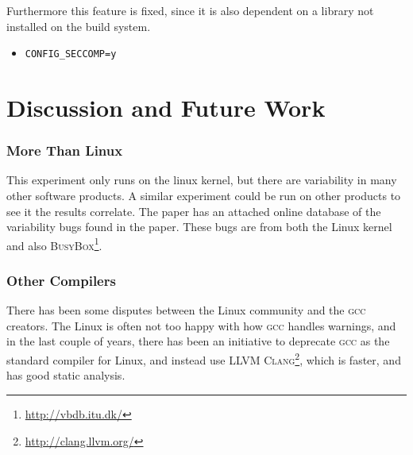 \documentclass[a4paper,11pt]{report}
\newcommand{\f}{\footnote{\fn}}
\newcommand{\textcode}[1]{\fboxsep=1pt\texttt{\colorbox{gray!20}{#1}}}
\begin{document}
Furthermore this feature is fixed, since it is also dependent on a library not 
installed on the build system.

\begin{itemize}
    \item \textcode{CONFIG\_SECCOMP=y}
\end{itemize}





            \newpage
            \chapter{Discussion and Future Work}

            \subsection*{More Than Linux}

            \def \fn {\url{http://vbdb.itu.dk/}}

This experiment only runs on the linux kernel, but there are variability in many
other software products. A similar experiment could be run on other products to 
see it the results correlate. The paper \cite{42bugs} has an attached online 
database of the variability bugs found in the paper. These bugs are from both 
the Linux kernel and also \textsc{BusyBox}\f.

            \subsection*{Other Compilers}
            

            \def \fn {\url{http://clang.llvm.org/}}

There has been some disputes between the Linux community and the \textsc{gcc} 
creators\cite{linusgcc}. The Linux is often not too happy with how \textsc{gcc} 
handles warnings, and in the last couple of years, there has been an initiative 
to deprecate \textsc{gcc} as the standard compiler for Linux, and instead use 
\textsc{LLVM Clang}\f, which is faster, and has good static analysis\cite{clang}.


\end{document}
